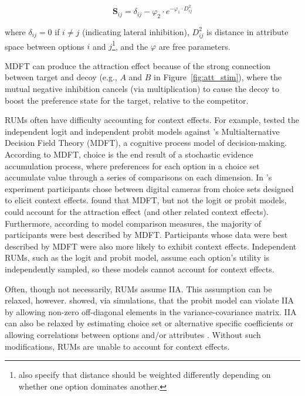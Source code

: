 \begin{equation}
    \boldsymbol{S}_{ij}=\delta_{ij}-\varphi_{2} \cdot e^{-\varphi_{1} \cdot D^2_{ij}}
    \label{eqn:mdft2}
\end{equation}

where $\delta_{ij}=0$ if $i\neq j$ (indicating lateral inhibition), $D^2_{ij}$ is distance in attribute space between options $i$ and $j$\footnote{\textcite{hotalingTheoreticalDevelopmentsDecision2010} also specify that distance should be weighted differently depending on whether one option dominates another.}, and the $\varphi$ are free parameters. 

MDFT can produce the attraction effect because of the strong connection between target and decoy (e.g., $A$ and $B$ in Figure~\ref{fig:att_stim}), where the mutual negative inhibition cancels (via multiplication) to cause the decoy to boost the preference state for the target, relative to the competitor. 

RUMs often have difficulty accounting for context effects. For example, \textcite{berkowitschRigorouslyTestingMultialternative2014b} tested the independent logit and independent probit models against \textcite{roeMultialternativeDecisionField2001a}'s Multialternative Decision Field Theory (MDFT), a cognitive process model of decision-making. According to MDFT, choice is the end result of a stochastic evidence accumulation process, where preferences for each option in a choice set accumulate value through a series of comparisons on each dimension. In \textcite{berkowitschRigorouslyTestingMultialternative2014b}'s experiment participants chose between digital cameras from choice sets designed to elicit context effects. \textcite{berkowitschRigorouslyTestingMultialternative2014b} found that MDFT, but not the logit or probit models, could account for the attraction effect (and other related context effects). Furthermore, according to model comparison measures, the majority of participants were best described by MDFT. Participants whose data were best described by MDFT were also more likely to exhibit context effects. Independent RUMs, such as the logit and probit model, assume each option's utility is independently sampled, so these models cannot account for context effects.

Often, though not necessarily, RUMs assume IIA. This assumption can be relaxed, however. \textcite{paetzUtilityIndependenceIIA2018} showed, via simulations, that the probit model can violate IIA by allowing non-zero off-diagonal elements in the variance-covariance matrix. IIA can also be relaxed by estimating choice set or alternative specific coefficients \parencite{rooderkerk2011incorporating} or allowing correlations between options and/or attributes \parencite{haaijer1998utility}. Without such modifications, RUMs are unable to account for context effects. 


